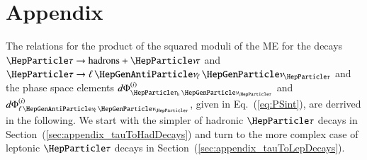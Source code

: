 \section{Appendix}
\label{sec:appendix}

The relations for the product of the squared moduli of the ME for the decays
$\Pgt \to \textrm{hadrons} + \Pnut$ and $\Pgt \to \ellnunu$ and the phase space elements
$d\Phi^{(i)}_{\tauhnu}$ and $d\Phi^{(i)}_{\ellnunu}$, given in Eq.~(\ref{eq:PSint}),
are derrived in the following.
We start with the simpler of hadronic $\Pgt$ decays in Section~(\ref{sec:appendix_tauToHadDecays}) and turn to the more complex case of leptonic $\Pgt$ decays in Section~(\ref{sec:appendix_tauToLepDecays}).